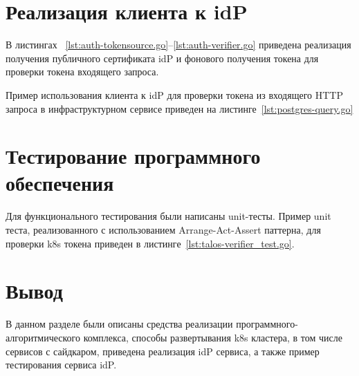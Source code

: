 \section{Реализация клиента к idP}
В листингах ~\ref{lst:auth-tokensource.go}--\ref{lst:auth-verifier.go} приведена реализация получения публичного сертификата idP и фонового получения токена для проверки токена входящего запроса.

%

Пример использования клиента к idP для проверки токена из входящего HTTP запроса в инфраструктурном сервисе приведен на листинге~\ref{lst:postgres-query.go}


\section{Тестирование программного обеспечения}

Для функционального тестирования были написаны unit-тесты.
Пример unit теста, реализованного с использованием Arrange-Act-Assert паттерна, для проверки k8s токена приведен в листинге~\ref{lst:talos-verifier_test.go}.


\section*{Вывод}
В данном разделе были описаны средства реализации программного-алгоритмического комплекса, способы развертывания k8s кластера, в том числе сервисов с сайдкаром, приведена реализация idP сервиса, а также пример тестирования сервиса idP.

%	
%
%
